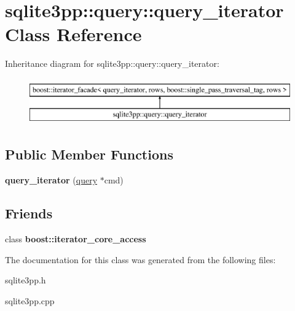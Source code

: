 \hypertarget{classsqlite3pp_1_1query_1_1query__iterator}{\section{sqlite3pp\-:\-:query\-:\-:query\-\_\-iterator Class Reference}
\label{classsqlite3pp_1_1query_1_1query__iterator}
}
Inheritance diagram for sqlite3pp\-:\-:query\-:\-:query\-\_\-iterator\-:\begin{figure}[H]
\begin{center}
\leavevmode
\includegraphics[height=2.000000cm]{classsqlite3pp_1_1query_1_1query__iterator}
\end{center}
\end{figure}
\subsection*{Public Member Functions}
\begin{DoxyCompactItemize}
\item 
\hypertarget{classsqlite3pp_1_1query_1_1query__iterator_a1b1a753061b77cfb060190cf6ea4562f}{{\bfseries query\-\_\-iterator} (\hyperlink{classsqlite3pp_1_1query}{query} $\ast$cmd)}\label{classsqlite3pp_1_1query_1_1query__iterator_a1b1a753061b77cfb060190cf6ea4562f}

\end{DoxyCompactItemize}
\subsection*{Friends}
\begin{DoxyCompactItemize}
\item 
\hypertarget{classsqlite3pp_1_1query_1_1query__iterator_ac09f73e325921cc50ebcd96bed0f8096}{class {\bfseries boost\-::iterator\-\_\-core\-\_\-access}}\label{classsqlite3pp_1_1query_1_1query__iterator_ac09f73e325921cc50ebcd96bed0f8096}

\end{DoxyCompactItemize}


The documentation for this class was generated from the following files\-:\begin{DoxyCompactItemize}
\item 
sqlite3pp.\-h\item 
sqlite3pp.\-cpp\end{DoxyCompactItemize}
